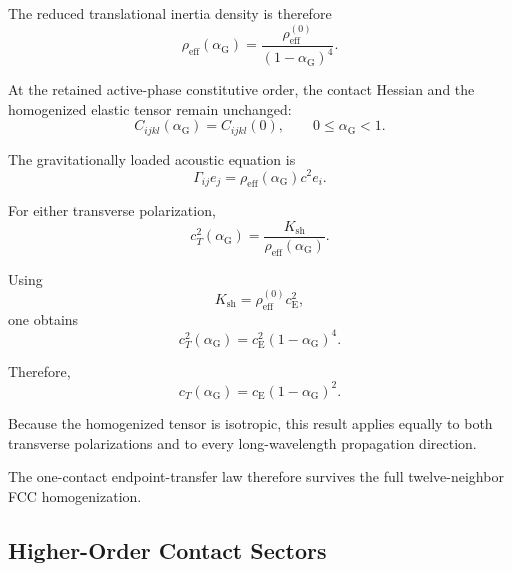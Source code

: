 The reduced translational inertia density is therefore
\begin{equation}
    \boxed{ \rho_{\mathrm{eff}} \left( \alpha_{\mathrm{G}} \right) = \frac{ \rho_{\mathrm{eff}}^{(0)} }{ \left( 1-\alpha_{\mathrm{G}} \right)^4 }. }
\end{equation}

At the retained active-phase constitutive order, the contact Hessian and the homogenized elastic tensor remain unchanged:
\begin{equation}
    \boxed{ C_{ijkl} \left( \alpha_{\mathrm{G}} \right) = C_{ijkl}(0), \qquad 0 \leq \alpha_{\mathrm{G}} < 1. }
\end{equation}

The gravitationally loaded acoustic equation is
\begin{equation}
    \Gamma_{ij}e_j = \rho_{\mathrm{eff}} \left( \alpha_{\mathrm{G}} \right) c^2e_i.
\end{equation}

For either transverse polarization,
\begin{equation}
    c_T^2 \left( \alpha_{\mathrm{G}} \right) = \frac{ K_{\mathrm{sh}} }{ \rho_{\mathrm{eff}} \left( \alpha_{\mathrm{G}} \right) }.
\end{equation}

Using
\begin{equation}
    K_{\mathrm{sh}} = \rho_{\mathrm{eff}}^{(0)} c_{\mathrm{E}}^2,
\end{equation}
one obtains
\begin{equation}
    c_T^2 \left( \alpha_{\mathrm{G}} \right) = c_{\mathrm{E}}^2 \left( 1-\alpha_{\mathrm{G}} \right)^4.
\end{equation}

Therefore,
\begin{equation}
    \boxed{ c_T \left( \alpha_{\mathrm{G}} \right) = c_{\mathrm{E}} \left( 1-\alpha_{\mathrm{G}} \right)^2. }
\end{equation}

Because the homogenized tensor is isotropic, this result applies equally to both transverse polarizations and to every long-wavelength propagation direction.

The one-contact endpoint-transfer law therefore survives the full twelve-neighbor FCC homogenization.

\subsection{Higher-Order Contact Sectors}

